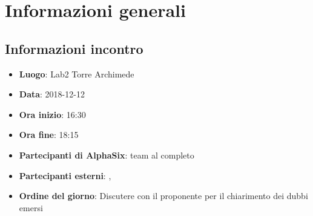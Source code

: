 \newcommand{\documento}{\VE}
\newcommand{\nomedocumentofisico}{VE\_2018-12-12.pdf}
\newcommand{\redazione}{\TG}
\newcommand{\verifica}{\SG}
\newcommand{\approvazione}{\CV}
\newcommand{\versione}{1.0.0}
\newcommand{\uso}{Esterno}
\newcommand{\destinateTo}{\TV, \\ & \RC, \\ & \II}
\newcommand{\datacreazione}{15 dicembre 2018}
\newcommand{\datamodifica}{17 dicembre 2018}
\newcommand{\stato}{Approvato}

\def\TABELLE{false}	%
\def\FIGURE{false} 	%






    

    	
    
    \section{Informazioni generali}
		\subsection{Informazioni incontro}
			\begin{itemize}
				\item { \textbf{Luogo}: Lab2 Torre Archimede}
				\item {\textbf{Data}: 2018-12-12}
				\item {\textbf{Ora inizio}: 16:30}
				\item {\textbf{Ora fine}: 18:15}
				\item {\textbf{Partecipanti di AlphaSix}: team al completo}
				\item {\textbf{Partecipanti esterni}: {\LuC}, {\DZ}}
				\item {\textbf{Ordine del giorno}: Discutere con il proponente per il chiarimento dei dubbi emersi}
			\end{itemize}

